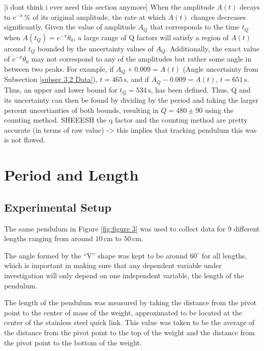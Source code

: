 \documentclass[11pt]{article}
\begin{document}
\begin{multicols}{2}
{[i dont think i ever need this section anymore] When the amplitude $A(t)$ decays to $e^{-\pi}\,\%$ of its original amplitude, the rate at which $A(t)$ changes decreases significantly. Given the value of amplitude $A_Q$ that corresponds to the time $t_Q$ when $A(t_Q) = e^{-\pi}\theta_0$, a large range of Q factors will satisfy a region of $A(t)$ around $t_Q$ bounded by the uncertainty values of $A_Q$. Additionally, the exact value of $e^{-\pi}\theta_0$ may  not correspond to any of the amplitudes but rather some angle in between two peaks. For example, if $A_Q + 0.009 = A(t)$ (Angle uncertainty from Subsection \ref{subsec 3.2 Data}), $t = 465\,\text{s}$, and if $A_Q - 0.009 = A(t)$, $t = 651\,\text{s}$. Thus, an upper and lower bound for $t_Q = 534\,\text{s}$, has been defined. Thus, Q and its uncertainty can then be found by dividing by the period and taking the larger percent uncertianties of both bounds, resulting in $Q = 480 \pm 90$ using the counting method.
SHEEESH the q factor and the counting method are pretty accurate (in terms of raw value) -> this implies that tracking pendulum this was is not flawed.


}


{\color{blue}

\section{Period and Length} \label{Period and Length}

\subsection{Experimental Setup}
The same pendulum in Figure \ref{fig:figure 3} was used to collect data for 9 different lengths ranging from around $10\,$cm to $50\,$cm.

The angle formed by the ``V'' shape was kept to be around $60^\circ$ for all lengths, which is important in making sure that any dependent variable under investigation will only depend on one independent variable, the length of the pendulum.

The length of the pendulum was measured by taking the distance from the pivot point to the center of mass of the weight, approximated to be located at the center of the stainless steel quick link. This value was taken to be the average of the distance from the pivot point to the top of the weight and the distance from the pivot point to the bottom of the weight.

}
\end{multicols}
\end{document}
